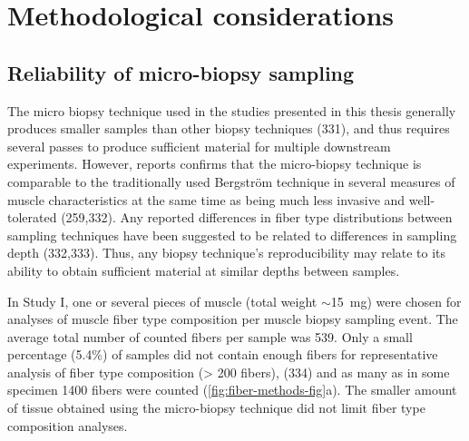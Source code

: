\documentclass[twoside,10pt]{gihclass} %
\begin{document}
\hypertarget{methodological-considerations}{%
\chapter{Methodological considerations}\label{methodological-considerations}}

\hypertarget{reliability-of-micro-biopsy-sampling}{%
\section{Reliability of micro-biopsy sampling}\label{reliability-of-micro-biopsy-sampling}}

The micro biopsy technique used in the studies presented in this thesis generally produces smaller samples than other biopsy techniques (331), and thus
requires several passes to produce sufficient material for multiple
downstream experiments. However, reports confirms that the micro-biopsy
technique is comparable to the traditionally used Bergström technique in
several measures of muscle characteristics at the same time as being much less invasive and
well-tolerated (259,332).
Any reported differences in fiber type distributions between sampling techniques have been suggested to be related to differences in sampling depth (332,333).
Thus, any biopsy technique's reproducibility may relate to its ability to obtain sufficient material at similar depths between samples.

In Study I, one or several pieces of muscle (total weight
\(\sim\)\SI{15}{mg}) were chosen for analyses of muscle fiber type composition per muscle biopsy sampling event. The average total number of counted fibers per sample was 539.
Only a small percentage (5.4\%) of samples did not contain enough fibers for representative analysis of fiber type composition (\textgreater{} 200 fibers),
(334)
and as many as in some specimen 1400 fibers were counted (\ref{fig:fiber-methods-fig}a).
The smaller amount of tissue obtained using the micro-biopsy technique did not limit fiber type composition analyses.
\end{document}
